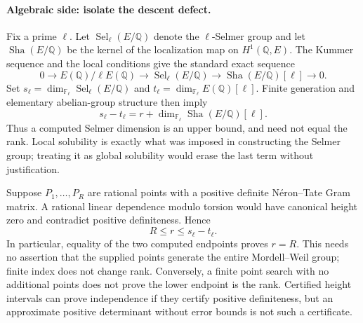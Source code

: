 \documentclass[11pt]{article}
\begin{document}
\paragraph{Algebraic side: isolate the descent defect.}
Fix a prime $\ell$. Let $\operatorname{Sel}_\ell(E/\mathbb Q)$ denote the
$\ell$-Selmer group and let $\operatorname{Sha}(E/\mathbb Q)$ be the kernel of the
localization map on $H^1(\mathbb Q,E)$. The Kummer sequence and the local
conditions give the standard exact sequence
\begin{equation}\label{cont6:kummer}
 0\longrightarrow E(\mathbb Q)/\ell E(\mathbb Q)
 \longrightarrow\operatorname{Sel}_\ell(E/\mathbb Q)
 \longrightarrow\operatorname{Sha}(E/\mathbb Q)[\ell]\longrightarrow0.
\end{equation}
Set $s_\ell=\dim_{\mathbb F_\ell}\operatorname{Sel}_\ell(E/\mathbb Q)$
and $t_\ell=\dim_{\mathbb F_\ell}E(\mathbb Q)[\ell]$. Finite generation
and elementary abelian-group structure then imply
\begin{equation}\label{cont6:rankdefect}
 s_\ell-t_\ell
 =r+\dim_{\mathbb F_\ell}\operatorname{Sha}(E/\mathbb Q)[\ell].
\end{equation}
Thus a computed Selmer dimension is an upper bound, and need not equal
the rank. Local solubility is exactly what was imposed in constructing
the Selmer group; treating it as global solubility would erase the last
term without justification.

Suppose $P_1,\ldots,P_R$ are rational points with a positive definite
N\'eron--Tate Gram matrix. A rational linear dependence modulo torsion
would have canonical height zero and contradict positive definiteness.
Hence
\begin{equation}\label{cont6:sandwich}
 R\le r\le s_\ell-t_\ell.
\end{equation}
In particular, equality of the two computed endpoints proves $r=R$.
This needs no assertion that the supplied points generate the entire
Mordell--Weil group; finite index does not change rank. Conversely, a
finite point search with no additional points does not prove the lower
endpoint is the rank. Certified height intervals can prove independence
if they certify positive definiteness, but an approximate positive
determinant without error bounds is not such a certificate.
\end{document}
